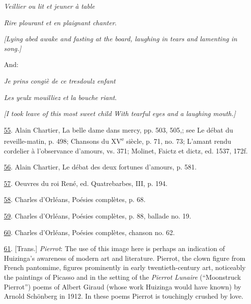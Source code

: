 \emph{Veillier ou lit et jeuner à table}

\emph{Rire plourant et en plaignant chanter}.

\emph{{[}Lying abed awake and fasting at the board, laughing in tears
and lamenting in song.{]}}

And:

\emph{Je prins congiè de ce tresdoulz enfant}

\emph{Les yeulx mouilliez et la bouche riant}.

\emph{{[}I took leave of this most sweet child With tearful eyes and a
laughing mouth.{]}}

\protect\hypertarget{23_NOTES.xhtmlux5cux23id_203}{\protect\hyperlink{21_Chapter_Thirteen__IMAGE_AND_WORD.xhtmlux5cux23id_202}{55}}.
Alain Chartier, La belle dame dans mercy, pp. 503, 505,; see Le débat du
reveille-matin, p. 498; Chansons du XV\textsuperscript{e} siècle, p. 71,
no. 73; L'amant rendu cordelier à l'observance d'amours, vs. 371;
Molinet, Faictz et dictz, ed. 1537, 172f.

\protect\hypertarget{23_NOTES.xhtmlux5cux23id_201}{\protect\hyperlink{21_Chapter_Thirteen__IMAGE_AND_WORD.xhtmlux5cux23id_200}{56}}.
Alain Chartier, Le débat des deux fortunes d'amours, p. 581.

\protect\hypertarget{23_NOTES.xhtmlux5cux23id_199}{\protect\hyperlink{21_Chapter_Thirteen__IMAGE_AND_WORD.xhtmlux5cux23id_198}{57}}.
Oeuvres du roi René, ed. Quatrebarbes, III, p. 194.

\protect\hypertarget{23_NOTES.xhtmlux5cux23id_197}{\protect\hyperlink{21_Chapter_Thirteen__IMAGE_AND_WORD.xhtmlux5cux23id_196}{58}}.
Charles d'Orléans, Poésies complètes, p. 68.

\protect\hypertarget{23_NOTES.xhtmlux5cux23id_195}{\protect\hyperlink{21_Chapter_Thirteen__IMAGE_AND_WORD.xhtmlux5cux23id_194}{59}}.
Charles d'Orléans, Poésies complètes, p. 88, ballade no. 19.

\protect\hypertarget{23_NOTES.xhtmlux5cux23id_193}{\protect\hyperlink{21_Chapter_Thirteen__IMAGE_AND_WORD.xhtmlux5cux23id_192}{60}}.
Charles d'Orléans, Poésies complètes, chanson no. 62.

\protect\hypertarget{23_NOTES.xhtmlux5cux23id_191}{\protect\hyperlink{21_Chapter_Thirteen__IMAGE_AND_WORD.xhtmlux5cux23id_190}{61}}.
{[}Trans.{]} \emph{Pierrot}: The use of this image here is perhaps an
indication of Huizinga's awareness of modern art and literature.
Pierrot, the clown figure from French pantomime, figures prominently in
early twentieth-century art, noticeably the paintings of Picasso and in
the setting of the \emph{Pierrot Lunaire} (``Moonstruck Pierrot'') poems
of Albert Giraud (whose work Huizinga would have known) by Arnold
Schönberg in 1912. In these poems Pierrot is touchingly crushed by love.

